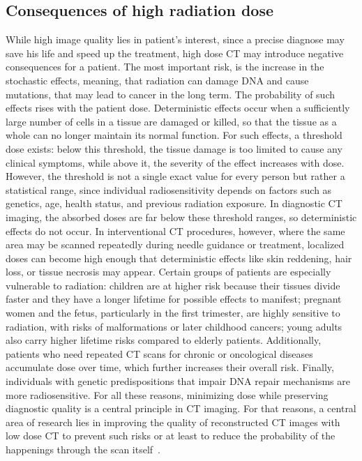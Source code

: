 \documentclass[12pt,a4paper]{article}
\begin{document}
\subsection{Consequences of high radiation dose}
While high image quality lies in patient's interest, since a precise diagnose may save his life and speed up the treatment, high dose CT may introduce negative consequences for a patient. The most important risk, is the increase in the stochastic effects, meaning, that radiation can damage DNA and cause mutations, that may lead to cancer in the long term. The probability of such effects rises with the patient dose. Deterministic effects occur when a sufficiently large number of cells in a tissue are damaged or killed, so that the tissue as a whole can no longer maintain its normal function. For such effects, a threshold dose exists: below this threshold, the tissue damage is too limited to cause any clinical symptoms, while above it, the severity of the effect increases with dose. However, the threshold is not a single exact value for every person but rather a statistical range, since individual radiosensitivity depends on factors such as genetics, age, health status, and previous radiation exposure. In diagnostic CT imaging, the absorbed doses are far below these threshold ranges, so deterministic effects do not occur. In interventional CT procedures, however, where the same area may be scanned repeatedly during needle guidance or treatment, localized doses can become high enough that deterministic effects like skin reddening, hair loss, or tissue necrosis may appear. Certain groups of patients are especially vulnerable to radiation: children are at higher risk because their tissues divide faster and they have a longer lifetime for possible effects to manifest; pregnant women and the fetus, particularly in the first trimester, are highly sensitive to radiation, with risks of malformations or later childhood cancers; young adults also carry higher lifetime risks compared to elderly patients. Additionally, patients who need repeated CT scans for chronic or oncological diseases accumulate dose over time, which further increases their overall risk. Finally, individuals with genetic predispositions that impair DNA repair mechanisms are more radiosensitive. For all these reasons, minimizing dose while preserving diagnostic quality is a central principle in CT imaging. For that reasons, a central area of research lies in improving the quality of reconstructed CT images with low dose CT to prevent such risks or at least to reduce the probability of the happenings through the scan itself~\cite{Bos2023RadiationExposureCT}.
\end{document}
